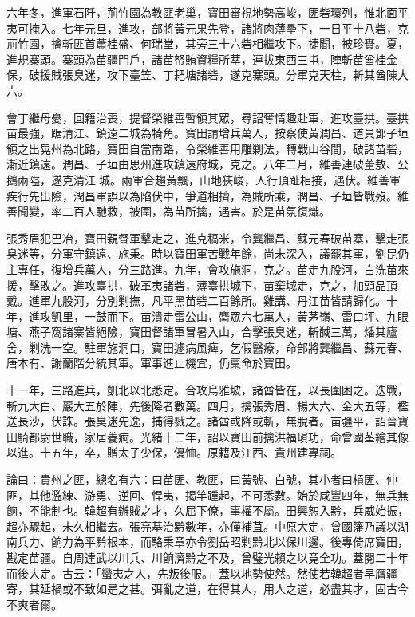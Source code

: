 \begin{pinyinscope}
六年冬，進軍石阡，荊竹園為教匪老巢，寶田審視地勢高峻，匪砦環列，惟北面平夷可掩入。七年元旦，進攻，部將黃元果先登，諸將肉薄壘下，一日平十八砦，克荊竹園，擒斬匪首蕭桂盛、何瑞堂，其旁三十六砦相繼攻下。捷聞，被珍賚。夏，進規寨頭。寨頭為苗疆門戶，諸苗帑賄資糧所萃，連拔東西三屯，陣斬苗酋桂金保，破援賊張臭迷，攻下臺笠、丁耙塘諸砦，遂克寨頭。分軍克天柱，斬其酋陳大六。

會丁繼母憂，回籍治喪，提督榮維善暫領其眾，尋詔奪情趣赴軍，進攻臺拱。臺拱苗最強，踞清江、鎮遠二城為犄角。寶田請增兵萬人，按察使黃潤昌、道員鄧子垣領之出晃州為北路，寶田自當南路，令榮維善用雕剿法，轉戰山谷間，破諸苗砦，漸近鎮遠。潤昌、子垣由思州進攻鎮遠府城，克之。八年二月，維善連破董敖、公鵝兩隘，遂克清江城。兩軍合趨黃飄，山地狹峻，人行頂趾相接，遇伏。維善軍疾行先出險，潤昌軍誤以為陷伏中，爭道相擠，為賊所乘，潤昌、子垣皆戰歿。維善聞變，率二百人馳救，被圍，為苗所擒，遇害。於是苗氛復熾。

張秀眉犯巴冶，寶田親督軍擊走之，進克稿米，令龔繼昌、蘇元春破苗寨，擊走張臭迷等，分軍守鎮遠、施秉。時以寶田軍苦戰年餘，尚未深入，議罷其軍，劉昆仍主專任，復增兵萬人，分三路進。九年，會攻施洞，克之。苗走九股河，白洗苗來援，擊敗之。進攻臺拱，破革夷諸砦，薄臺拱城下，苗棄城走，克之，加頭品頂戴。進軍九股河，分別剿撫，凡平黑苗砦二百餘所。雞講、丹江苗皆請歸化。十年，進攻凱里，一鼓而下。苗潰走雷公山，麕眾六七萬人，黃茅嶺、雷口坪、九眼塘、燕子窩諸寨皆絕險，寶田督諸軍冒暑入山，合擊張臭迷，斬馘三萬，燔其廬舍，剿洗一空。駐軍施洞口，寶田遽病風痺，乞假醫療，命部將龔繼昌、蘇元春、唐本有、謝蘭階分統其軍。軍事進止機宜，仍稟命於寶田。

十一年，三路進兵，凱北以北悉定。合攻烏雅坡，諸酋皆在，以長圍困之。迭戰，斬九大白、巖大五於陣，先後降者數萬。四月，擒張秀眉、楊大六、金大五等，檻送長沙，伏誅。張臭迷先逸，捕得戮之。諸酋或降或斬，無脫者。苗疆平，詔晉寶田騎都尉世職，家居養痾。光緒十二年，詔以寶田前擒洪福瑱功，命曾國荃繪其像以進。十五年，卒，贈太子少保，優恤。原籍及江西、貴州建專祠。

論曰：貴州之匪，總名有六：曰苗匪、教匪，曰黃號、白號，其小者曰槓匪、仲匪，其他濫練、游勇、逆回、悍夷，揭竿踵起，不可悉數。始於咸豐四年，無兵無餉，不能制也。韓超有辦賊之才，久屈下僚，事權不屬。田興恕入黔，兵威始振，超亦驟起，未久相繼去。張亮基治黔數年，亦僅補苴。中原大定，曾國籓乃議以湖南兵力、餉力為平黔根本，而駱秉章亦令劉岳昭剿黔北以保川邊。後專倚席寶田，戡定苗疆。自周達武以川兵、川餉濟黔之不及，曾璧光賴之以竟全功。蓋閱二十年而後大定。古云：「蠻夷之人，先叛後服。」蓋以地勢使然。然使若韓超者早膺疆寄，其延禍或不致如是之甚。弭亂之道，在得其人，用人之道，必盡其才，固古今不爽者爾。


\end{pinyinscope}